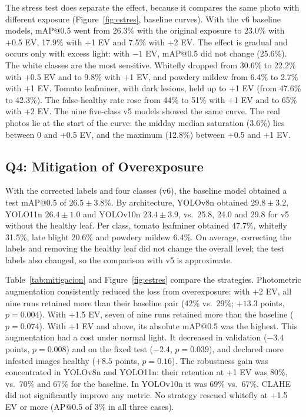 \documentclass[sensors,article,submit,pdftex,moreauthors]{Definitions/mdpi}
\begin{document}
The stress test does separate the effect, because it compares the same photo with different exposure (Figure~\ref{fig:estres}, baseline curves). With the v6 baseline models, mAP@0.5 went from 26.3\% with the original exposure to 23.0\% with +0.5 EV, 17.9\% with +1 EV and 7.5\% with +2 EV. The effect is gradual and occurs only with excess light: with $-1$ EV, mAP@0.5 did not change (25.6\%). The white classes are the most sensitive. Whitefly dropped from 30.6\% to 22.2\% with +0.5 EV and to 9.8\% with +1 EV, and powdery mildew from 6.4\% to 2.7\% with +1 EV. Tomato leafminer, with dark lesions, held up to +1 EV (from 47.6\% to 42.3\%). The false-healthy rate rose from 44\% to 51\% with +1 EV and to 65\% with +2 EV. The nine five-class v5 models showed the same curve. The real photos lie at the start of the curve: the midday median saturation (3.6\%) lies between 0 and +0.5 EV, and the maximum (12.8\%) between +0.5 and +1 EV.

\subsection{Q4: Mitigation of Overexposure}

With the corrected labels and four classes (v6), the baseline model obtained a test mAP@0.5 of $26.5 \pm 3.8\%$. By architecture, YOLOv8n obtained $29.8 \pm 3.2$, YOLO11n $26.4 \pm 1.0$ and YOLOv10n $23.4 \pm 3.9$, vs.\ 25.8, 24.0 and 29.8 for v5 without the healthy leaf. Per class, tomato leafminer obtained 47.7\%, whitefly 31.5\%, late blight 20.6\% and powdery mildew 6.4\%. On average, correcting the labels and removing the healthy leaf did not change the overall level; the test labels also changed, so the comparison with v5 is approximate.

Table~\ref{tab:mitigacion} and Figure~\ref{fig:estres} compare the strategies. Photometric augmentation consistently reduced the loss from overexposure: with +2 EV, all nine runs retained more than their baseline pair (42\% vs.\ 29\%; $+13.3$ points, $p = 0.004$). With +1.5 EV, seven of nine runs retained more than the baseline ($p = 0.074$). With +1 EV and above, its absolute mAP@0.5 was the highest. This augmentation had a cost under normal light. It decreased in validation ($-3.4$ points, $p = 0.008$) and on the fixed test ($-2.4$, $p = 0.039$), and declared more infested images healthy ($+8.5$ points, $p = 0.16$). The robustness gain was concentrated in YOLOv8n and YOLO11n: their retention at +1 EV was 80\%, vs.\ 70\% and 67\% for the baseline. In YOLOv10n it was 69\% vs.\ 67\%. CLAHE did not significantly improve any metric. No strategy rescued whitefly at +1.5 EV or more (AP@0.5 of 3\% in all three cases).
\end{document}
